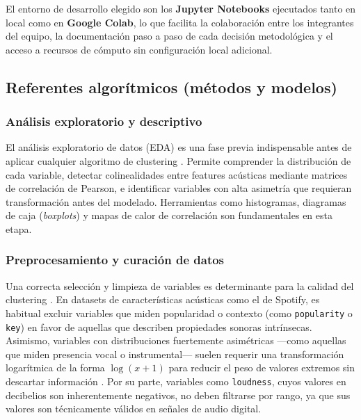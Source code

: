 El entorno de desarrollo elegido son los \textbf{Jupyter Notebooks} ejecutados tanto en local como en \textbf{Google Colab}, lo que facilita la colaboración entre los integrantes del equipo, la documentación paso a paso de cada decisión metodológica y el acceso a recursos de cómputo sin configuración local adicional.

\subsection{Referentes algorítmicos (métodos y modelos)}

\subsubsection{Análisis exploratorio y descriptivo}

El análisis exploratorio de datos (EDA) es una fase previa indispensable antes de aplicar cualquier algoritmo de clustering \cite{han2011data}. Permite comprender la distribución de cada variable, detectar colinealidades entre features acústicas mediante matrices de correlación de Pearson, e identificar variables con alta asimetría que requieran transformación antes del modelado. Herramientas como histogramas, diagramas de caja (\textit{boxplots}) y mapas de calor de correlación son fundamentales en esta etapa.

\subsubsection{Preprocesamiento y curación de datos}

Una correcta selección y limpieza de variables es determinante para la calidad del clustering \cite{han2011data}. En datasets de características acústicas como el de Spotify, es habitual excluir variables que miden popularidad o contexto (como \texttt{popularity} o \texttt{key}) en favor de aquellas que describen propiedades sonoras intrínsecas. Asimismo, variables con distribuciones fuertemente asimétricas ---como aquellas que miden presencia vocal o instrumental--- suelen requerir una transformación logarítmica de la forma $\log(x+1)$ para reducir el peso de valores extremos sin descartar información \cite{vanderplas2016python}. Por su parte, variables como \texttt{loudness}, cuyos valores en decibelios son inherentemente negativos, no deben filtrarse por rango, ya que sus valores son técnicamente válidos en señales de audio digital.

